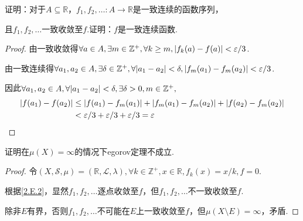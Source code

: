\newpage

\begin{problem}[4]\label{2.E.4}
    证明：对于\(A \subseteq \mathbb{R}\)，\(f_1, f_2, \dots: A \to \mathbb{R}\)是一致连续的函数序列，

    且\(f_1, f_2, \dots\)一致收敛至\(f\).证明：\(f\)是一致连续函数.
\end{problem}

\begin{proof}
    由一致收敛得\(\forall a \in A, \exists m \in \mathbb{Z}^+, \forall k \geq m, \abs*{f_k(a)-f(a)}<\varepsilon/3\).

    由一致连续得\(\forall a_1,a_2 \in A, \exists \delta \in \mathbb{Z}^+, \forall \abs*{a_1-a_2}<\delta, \abs*{f_m(a_1)-f_m(a_2)}<\varepsilon/3\).

    因此\(\forall a_1,a_2 \in A, \forall \abs*{a_1-a_2}<\delta, \exists \delta>0, m \in \mathbb{Z}^+,\)
    \begin{align*}
        \abs*{f(a_1)-f(a_2)} &\leq \abs*{f(a_1)-f_m(a_1)}+\abs*{f_m(a_1)-f_m(a_2)}+\abs*{f(a_2)-f_m(a_2)} \\
        &< \varepsilon/3+\varepsilon/3+\varepsilon/3=\varepsilon \qedhere
    \end{align*}
\end{proof}

\begin{problem}[5]\label{2.E.5}
    证明在\(\mu(X)=\infty\)的情况下egorov定理不成立.
\end{problem}

\begin{proof}
    令\((X, \mathcal{S}, \mu)=(\mathbb{R}, \mathcal{L}, \lambda), \forall k \in \mathbb{Z}^+, x \in \mathbb{R}, f_k(x)=x/k, f=0\).

    根据\cref{2.E.2}，显然\(f_1, f_2, \dots\)逐点收敛至\(f\)，但\(f_1, f_2, \dots\)不一致收敛至\(f\).

    除非\(E\)有界，否则\(f_1, f_2, \dots\)不可能在\(E\)上一致收敛至\(f\)，但\(\mu(X \setminus E)=\infty\)，矛盾.
\end{proof}


